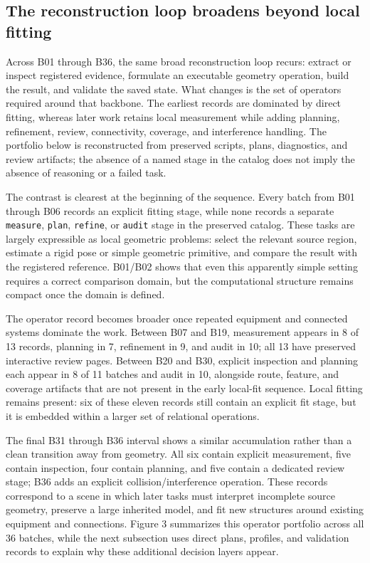 \documentclass[10pt,a4paper]{article}
\begin{document}
\hypertarget{the-reconstruction-loop-broadens-beyond-local-fitting}{%
\subsection{The reconstruction loop broadens beyond local
fitting}\label{the-reconstruction-loop-broadens-beyond-local-fitting}}

Across B01 through B36, the same broad reconstruction loop recurs:
extract or inspect registered evidence, formulate an executable geometry
operation, build the result, and validate the saved state. What changes
is the set of operators required around that backbone. The earliest
records are dominated by direct fitting, whereas later work retains
local measurement while adding planning, refinement, review,
connectivity, coverage, and interference handling. The portfolio below
is reconstructed from preserved scripts, plans, diagnostics, and review
artifacts; the absence of a named stage in the catalog does not imply
the absence of reasoning or a failed task.

The contrast is clearest at the beginning of the sequence. Every batch
from B01 through B06 records an explicit fitting stage, while none
records a separate \texttt{measure}, \texttt{plan}, \texttt{refine}, or
\texttt{audit} stage in the preserved catalog. These tasks are largely
expressible as local geometric problems: select the relevant source
region, estimate a rigid pose or simple geometric primitive, and compare
the result with the registered reference. B01/B02 shows that even this
apparently simple setting requires a correct comparison domain, but the
computational structure remains compact once the domain is defined.

The operator record becomes broader once repeated equipment and
connected systems dominate the work. Between B07 and B19, measurement
appears in 8 of 13 records, planning in 7, refinement in 9, and audit in
10; all 13 have preserved interactive review pages. Between B20 and B30,
explicit inspection and planning each appear in 8 of 11 batches and
audit in 10, alongside route, feature, and coverage artifacts that are
not present in the early local-fit sequence. Local fitting remains
present: six of these eleven records still contain an explicit fit
stage, but it is embedded within a larger set of relational operations.

The final B31 through B36 interval shows a similar accumulation rather
than a clean transition away from geometry. All six contain explicit
measurement, five contain inspection, four contain planning, and five
contain a dedicated review stage; B36 adds an explicit
collision/interference operation. These records correspond to a scene in
which later tasks must interpret incomplete source geometry, preserve a
large inherited model, and fit new structures around existing equipment
and connections. Figure 3 summarizes this operator portfolio across all
36 batches, while the next subsection uses direct plans, profiles, and
validation records to explain why these additional decision layers
appear.
\end{document}

